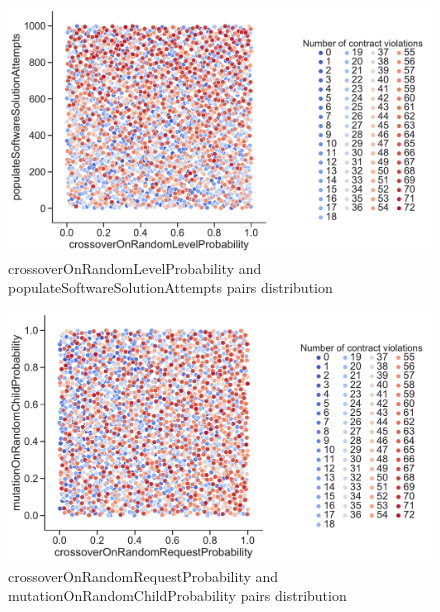\begin{figure}
	\centering
	\includegraphics[width=\textwidth]{images/PairsDistr/crossoverOnRandomLevelProbability_populateSoftwareSolutionAttempts.pdf}
	\caption[crossoverOnRandomLevelProbability and populateSoftwareSolutionAttempts pairs distribution]{crossoverOnRandomLevelProbability and populateSoftwareSolutionAttempts pairs distribution}
	\label{fig:crossoverOnRandomLevelProbability_populateSoftwareSolutionAttempts_pair}
\end{figure}
\begin{figure}
	\centering
	\includegraphics[width=\textwidth]{images/PairsDistr/crossoverOnRandomRequestProbability_mutationOnRandomChildProbability.pdf}
	\caption[crossoverOnRandomRequestProbability and mutationOnRandomChildProbability pairs distribution]{crossoverOnRandomRequestProbability and mutationOnRandomChildProbability pairs distribution}
	\label{fig:crossoverOnRandomRequestProbability_mutationOnRandomChildProbability_pair}
\end{figure}
